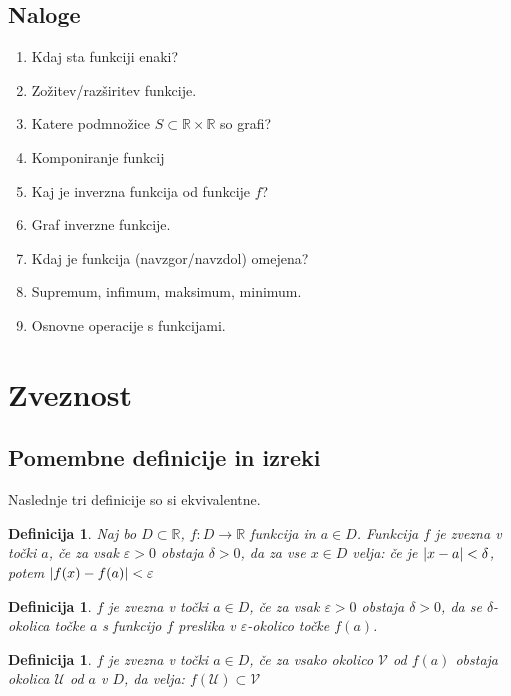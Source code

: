 \documentclass[a4paper,12pt]{report}
\newtheorem{definicija}[izrek]{Definicija}
\begin{document}
\subsection*{Naloge}

\begin{enumerate}
    \item Kdaj sta funkciji enaki?
    \item Zožitev/razširitev funkcije.
    \item Katere podmnožice $S \subset \mathbb{R} \times \mathbb{R}$ so grafi?
    \item Komponiranje funkcij
    \item Kaj je inverzna funkcija od funkcije $f$?
    \item Graf inverzne funkcije.
    \item Kdaj je funkcija (navzgor/navzdol) omejena?
    \item Supremum, infimum, maksimum, minimum.
    \item Osnovne operacije s funkcijami.
\end{enumerate}

\pagebreak

\section*{Zveznost}

\subsection*{Pomembne definicije in izreki}

Naslednje tri definicije so si ekvivalentne.
\begin{definicija}
    Naj bo $D \subset \mathbb{R}$, $f: D \to \mathbb{R}$ funkcija in $a \in D$. 
    Funkcija $f$ je zvezna v točki $a$, če za vsak $\varepsilon>0$ obstaja $\delta>0$, da 
    za vse $x \in D$ velja: če je $\abs{x-a} < \delta$, potem $\abs{f(x)-f(a)} < \varepsilon$
\end{definicija}

\begin{definicija}
    $f$ je zvezna v točki $a \in D$, če za vsak $\varepsilon > 0$ obstaja $\delta > 0$, 
    da se $\delta$-okolica točke $a$ s funkcijo $f$ preslika v $\varepsilon$-okolico točke $f(a)$.
\end{definicija}

\begin{definicija}
    $f$ je zvezna v točki $a \in D$, če za vsako okolico $\mathcal{V}$ od $f(a)$ obstaja okolica 
    $\mathcal{U}$ od $a$ v $D$, da velja: $f(\mathcal{U}) \subset \mathcal{V}$
\end{definicija}
\end{document}
